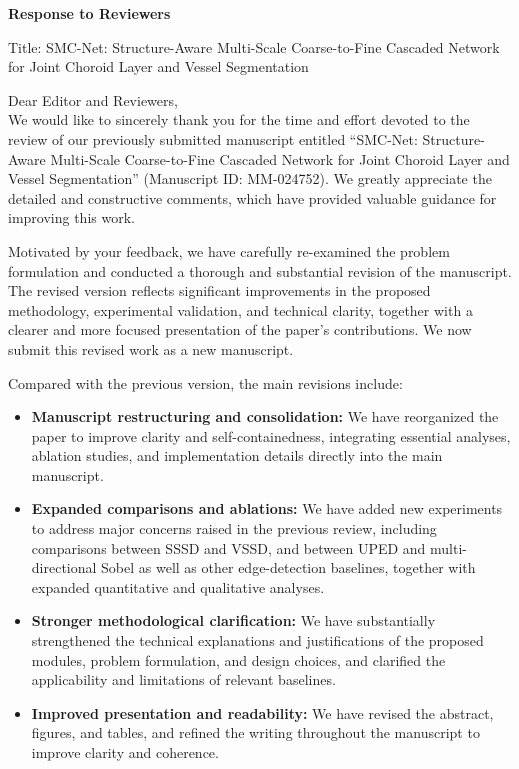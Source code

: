 \documentclass[11pt]{article}
\begin{document}
\begin{center}
    {\Large\bfseries Response to Reviewers}

    {\normalsize Title: SMC-Net: Structure-Aware Multi-Scale Coarse-to-Fine Cascaded Network for Joint Choroid Layer and Vessel Segmentation}
\end{center}

Dear Editor and Reviewers,\\
We would like to sincerely thank you for the time and effort devoted to the review of our previously submitted manuscript entitled
``SMC-Net: Structure-Aware Multi-Scale Coarse-to-Fine Cascaded Network for Joint Choroid Layer and Vessel Segmentation''
(Manuscript ID: MM-024752).
We greatly appreciate the detailed and constructive comments, which have provided valuable guidance for improving this work.

Motivated by your feedback, we have carefully re-examined the problem formulation and conducted a thorough and substantial revision of the manuscript.
The revised version reflects significant improvements in the proposed methodology, experimental validation, and technical clarity, together with a clearer and more focused presentation of the paper’s contributions.
We now submit this revised work as a new manuscript.

Compared with the previous version, the main revisions include:
\begin{itemize}
    \item \textbf{Manuscript restructuring and consolidation:} We have reorganized the paper to improve clarity and self-containedness, integrating essential analyses, ablation studies, and implementation details directly into the main manuscript.
    \item \textbf{Expanded comparisons and ablations:} We have added new experiments to address major concerns raised in the previous review, including comparisons between SSSD and VSSD, and between UPED and multi-directional Sobel as well as other edge-detection baselines, together with expanded quantitative and qualitative analyses.
    \item \textbf{Stronger methodological clarification:} We have substantially strengthened the technical explanations and justifications of the proposed modules, problem formulation, and design choices, and clarified the applicability and limitations of relevant baselines.
    \item \textbf{Improved presentation and readability:} We have revised the abstract, figures, and tables, and refined the writing throughout the manuscript to improve clarity and coherence.
\end{itemize}
\end{document}
